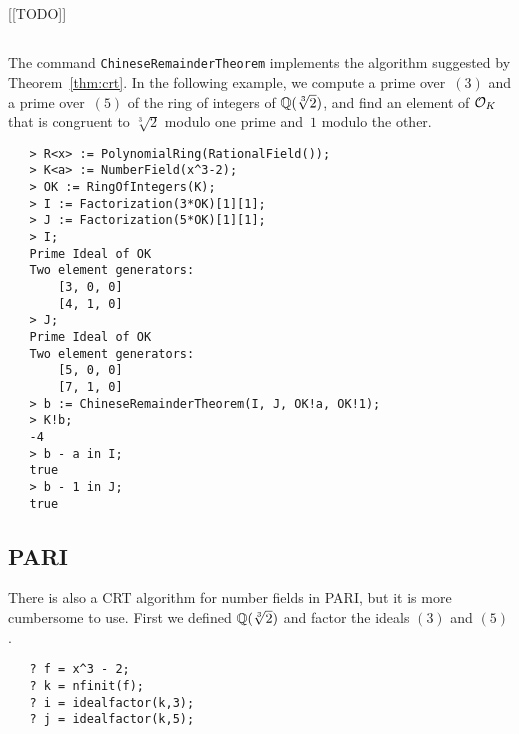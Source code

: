 
\subsection{\SAGE{}}
[[TODO]]

\subsection{\magma{}}
The \magma{} command {\tt ChineseRemainderTheorem} implements the
algorithm suggested by Theorem~\ref{thm:crt}.  In the following example,
we compute a prime over~$(3)$ and a prime over~$(5)$ of the ring of
integers of $\mathbb{Q}(\sqrt[3]{2})$, and find an element of $\mathcal{O}_K$ that is
congruent to $\sqrt[3]{2}$ modulo one prime and~$1$ modulo the other.
\begin{verbatim}
   > R<x> := PolynomialRing(RationalField());
   > K<a> := NumberField(x^3-2);
   > OK := RingOfIntegers(K);
   > I := Factorization(3*OK)[1][1];
   > J := Factorization(5*OK)[1][1];
   > I;
   Prime Ideal of OK
   Two element generators:
       [3, 0, 0]
       [4, 1, 0]
   > J;
   Prime Ideal of OK
   Two element generators:
       [5, 0, 0]
       [7, 1, 0]
   > b := ChineseRemainderTheorem(I, J, OK!a, OK!1);
   > K!b;
   -4
   > b - a in I;
   true
   > b - 1 in J;
   true
\end{verbatim}

\subsection{PARI}
There is also a CRT algorithm for number fields in PARI, but it
is more cumbersome to use.  First we defined $\mathbb{Q}(\sqrt[3]{2})$
and factor the ideals $(3)$ and $(5)$.
\begin{verbatim}
   ? f = x^3 - 2;
   ? k = nfinit(f);
   ? i = idealfactor(k,3);
   ? j = idealfactor(k,5);
\end{verbatim}

